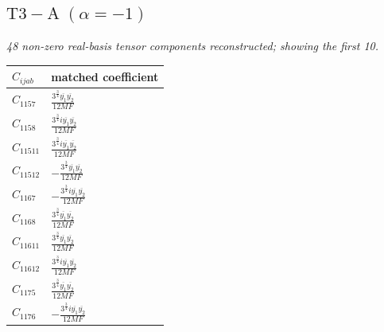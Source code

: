 \documentclass[9pt]{article}
\begin{document}
\subsection*{$ \mathrm{T3-A}\;(\alpha=-1) $}
\textit{48 non-zero real-basis tensor components reconstructed; showing the first 10.}
\begin{longtable}{@{}ll@{}}
\toprule
$C_{ijab}$ & matched coefficient \\
\midrule
$C_{1157}$ & $ \frac{3^{\frac{3}{4}} \overline{y_{1}} \overline{y_{2}}}{12 MF} $ \\
$C_{1158}$ & $ \frac{3^{\frac{3}{4}} i \overline{y_{1}} \overline{y_{2}}}{12 MF} $ \\
$C_{11511}$ & $ \frac{3^{\frac{3}{4}} i \overline{y_{1}} \overline{y_{2}}}{12 MF} $ \\
$C_{11512}$ & $ - \frac{3^{\frac{3}{4}} \overline{y_{1}} \overline{y_{2}}}{12 MF} $ \\
$C_{1167}$ & $ - \frac{3^{\frac{3}{4}} i \overline{y_{1}} \overline{y_{2}}}{12 MF} $ \\
$C_{1168}$ & $ \frac{3^{\frac{3}{4}} \overline{y_{1}} \overline{y_{2}}}{12 MF} $ \\
$C_{11611}$ & $ \frac{3^{\frac{3}{4}} \overline{y_{1}} \overline{y_{2}}}{12 MF} $ \\
$C_{11612}$ & $ \frac{3^{\frac{3}{4}} i \overline{y_{1}} \overline{y_{2}}}{12 MF} $ \\
$C_{1175}$ & $ \frac{3^{\frac{3}{4}} \overline{y_{1}} \overline{y_{2}}}{12 MF} $ \\
$C_{1176}$ & $ - \frac{3^{\frac{3}{4}} i \overline{y_{1}} \overline{y_{2}}}{12 MF} $ \\
\bottomrule
\end{longtable}
\end{document}
